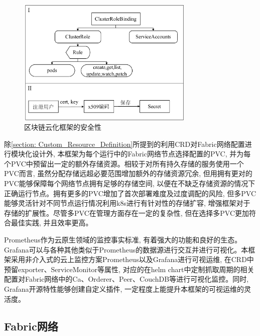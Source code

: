 \begin{figure}[h] %
    \centering %
    \includegraphics[width=0.75\textwidth]{FIGs/chapter3/safety.pdf} %
    \caption{区块链云化框架的安全性} %
    \label{safety} %
\end{figure}%

除\ref{section: Custom_Resource_Definition}所提到的利用CRD对Fabric网络配置进行模块化设计外, 本框架为每个运行中的Fabric网络节点选择配置的PVC, 并为每个PVC中预留出一定的额外存储资源。相较于对所有持久存储的服务使用一个PVC而言, 虽然分配存储远超必要范围增加额外的存储资源冗余, 但用拥有更对的PVC能够保障每个网络节点拥有足够的存储空间, 以便在不缺乏存储资源的情况下正确运行节点。拥有更多的PVC增加了首次部署难度及过度调配的风险, 但多PVC能够灵活针对不同节点运行情况利用k8s进行有针对性的存储扩容, 增强框架对于存储的扩展性。尽管多PVC在管理方面存在一定的复杂性, 但在选择多PVC更加符合最佳实践, 并且效率更高\cite{d2020design}。

Prometheus\cite{sukhija2019towards}作为云原生领域的监控事实标准, 有着强大的功能和良好的生态。
Grafana可以与各种其他类似于Prometheus的数据源进行交互并进行可视化。本框架采用非介入式的云上监控方案Prometheus以及Grafana进行可视运维, 在CRD中预留exporter、ServiceMonitor等属性, 对应的在helm chart中定制抓取周期的相关配置对Fabric网络中的Ca、Orderer、Peer、CouchDB等进行可视化监控。同时, Grafana开源特性能够创建自定义插件, 一定程度上能提升本框架的可视运维的灵活度。

\subsection{Fabric网络}

